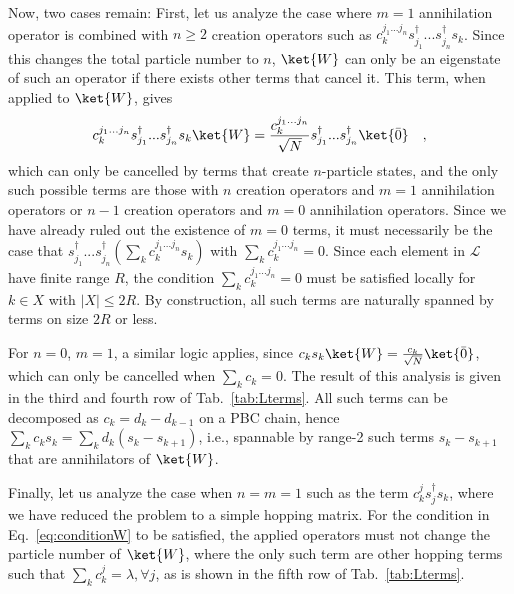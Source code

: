\documentclass[prx,letterpaper,aps,superscriptaddress,floatfix,twocolumn,nofootinbib]{revtex4-2}
\theoremstyle{definition}
\begin{document}
%
Now, two cases remain: First, let us analyze the case where $m=1$ annihilation operator is combined with $n\geq2$ creation operators such as $c^{j_1...j_n}_k s_{j_1}^\dag ... s_{j_n}^\dag s_{k}$. 
%
Since this changes the total particle number to $n$, $\ket{W}$ can only be an eigenstate of such an operator if there exists other terms that cancel it.
%
This term, when applied to $\ket{W}$, gives
$$c^{j_1...j_n}_ks_{j_1}^\dag ... s_{j_n}^\dag s_{k}\ket{W}=\frac{c^{j_1...j_n}_k}{\sqrt{N}}s_{j_1}^\dag ... s_{j_n}^\dag\ket{\bar{0}}\quad,$$
which can only be cancelled by terms that create $n$-particle states, and the only such possible terms are those with $n$ creation operators and $m=1$ annihilation operators or $n-1$ creation operators and $m=0$ annihilation operators.
%
Since we have already ruled out the existence of $m=0$ terms, it must necessarily be the case that $ s_{j_1}^\dag ... s_{j_n}^\dag \left(\sum_k c^{j_1...j_n}_k s_{k}\right)$ with $\sum_k c^{j_1...j_n}_k=0$.
%
Since each element in $\mathcal{L}$ have finite range $R$, the condition $\sum_k c^{j_1...j_n}_k=0$ must be satisfied locally for $k\in X$ with $|X|\leq 2R$.
%
By construction, all such terms are naturally spanned by terms on size $2R$ or less.
%

%
For $n=0$, $m=1$, a similar logic applies, since $c_k s_{k}\ket{W} = \frac{c_k}{\sqrt{N}} \ket{\bar{0}}$, which can only be cancelled when $\sum_k c_k=0$.
%
The result of this analysis is given in the third and fourth row of Tab.~\ref{tab:Lterms}.
%
All such terms can be decomposed as $c_k = d_k - d_{k-1}$ on a PBC chain, hence $\sum_k c_k s_k = \sum_k d_k (s_k - s_{k+1})$, i.e., spannable by range-2 such terms $s_k - s_{k+1}$ that are annihilators of $\ket{W}$.
%

%
Finally, let us analyze the case when $n=m=1$ such as the term $c^j_k  s_j^\dag s_k$, where we have reduced the problem to a simple hopping matrix. For the condition in Eq.~\eqref{eq:conditionW} to be satisfied, the applied operators must not change the particle number of $\ket{W}$, where the only such term are other hopping terms such that $\sum_k c^j_{k} = \lambda,\forall j$, as is shown in the fifth row of Tab.~\ref{tab:Lterms}.
%

%
\end{document}

